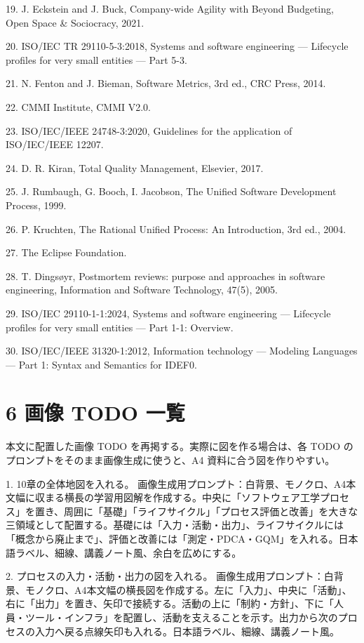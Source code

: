 \documentclass[uplatex,dvipdfmx,a4paper,11pt]{jsarticle}
\begin{document}
19. J. Eckstein and J. Buck, Company-wide Agility with Beyond Budgeting, Open Space \& Sociocracy, 2021.

20. ISO/IEC TR 29110-5-3:2018, Systems and software engineering — Lifecycle profiles for very small entities — Part 5-3.

21. N. Fenton and J. Bieman, Software Metrics, 3rd ed., CRC Press, 2014.

22. CMMI Institute, CMMI V2.0.

23. ISO/IEC/IEEE 24748-3:2020, Guidelines for the application of ISO/IEC/IEEE 12207.

24. D. R. Kiran, Total Quality Management, Elsevier, 2017.

25. J. Rumbaugh, G. Booch, I. Jacobson, The Unified Software Development Process, 1999.

26. P. Kruchten, The Rational Unified Process: An Introduction, 3rd ed., 2004.

27. The Eclipse Foundation.

28. T. Dingsøyr, Postmortem reviews: purpose and approaches in software engineering, Information and Software Technology, 47(5), 2005.

29. ISO/IEC 29110-1-1:2024, Systems and software engineering — Lifecycle profiles for very small entities — Part 1-1: Overview.

30. ISO/IEC/IEEE 31320-1:2012, Information technology — Modeling Languages — Part 1: Syntax and Semantics for IDEF0.

\section{6 画像 TODO 一覧}
本文に配置した画像 TODO を再掲する。実際に図を作る場合は、各 TODO のプロンプトをそのまま画像生成に使うと、A4 資料に合う図を作りやすい。

1. 10章の全体地図を入れる。 画像生成用プロンプト：白背景、モノクロ、A4本文幅に収まる横長の学習用図解を作成する。中央に「ソフトウェア工学プロセス」を置き、周囲に「基礎」「ライフサイクル」「プロセス評価と改善」を大きな三領域として配置する。基礎には「入力・活動・出力」、ライフサイクルには「概念から廃止まで」、評価と改善には「測定・PDCA・GQM」を入れる。日本語ラベル、細線、講義ノート風、余白を広めにする。

2. プロセスの入力・活動・出力の図を入れる。 画像生成用プロンプト：白背景、モノクロ、A4本文幅の横長図を作成する。左に「入力」、中央に「活動」、右に「出力」を置き、矢印で接続する。活動の上に「制約・方針」、下に「人員・ツール・インフラ」を配置し、活動を支えることを示す。出力から次のプロセスの入力へ戻る点線矢印も入れる。日本語ラベル、細線、講義ノート風。
\end{document}
